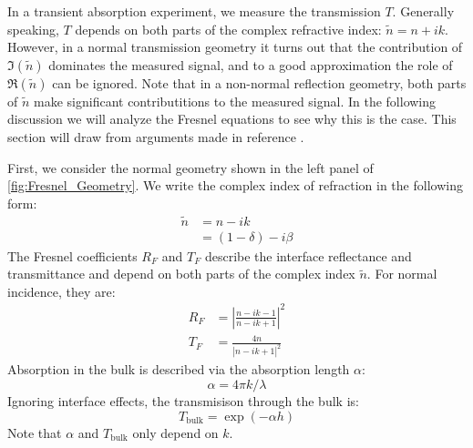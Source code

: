 In a transient absorption experiment, we measure the transmission $T$. Generally speaking, $T$ depends on both parts of the complex refractive index: $\tilde{n} = n + i k$. However, in a normal transmission geometry it turns out that the contribution of $\Im(\tilde{n})$ dominates the measured signal, and to a good approximation the role of $\Re(\tilde{n})$ can be ignored. Note that in a non-normal reflection geometry, both parts of $\tilde{n}$ make significant contributitions to the measured signal. In the following discussion we will analyze the Fresnel equations to see why this is the case. This section will draw from arguments made in reference \cite{nichelattiComplexRefractiveIndex2002}.

First, we consider the normal geometry shown in the left panel of \cref{fig:Fresnel_Geometry}. We write the complex index of refraction in the following form:
\begin{equation}
\begin{aligned}
\tilde{n} &= n - i k \\
&= (1-\delta) - i \beta
\end{aligned}
\label{eqn:complex_index}
\end{equation}
The Fresnel coefficients $R_F$ and $T_F$ describe the interface reflectance and transmittance and depend on both parts of the complex index $\tilde{n}$. For normal incidence, they are:
\begin{equation}
\begin{aligned}
R_F &= \left| \frac{n-ik-1}{n-ik+1}   \right|^2 \\
T_F &=  \frac{4n}{\left|n-ik+1\right|^2}
\end{aligned}
\label{eqn:fresnel_normal}
\end{equation}
Absorption in the bulk is described via the absorption length $\alpha$:
\begin{equation}
\alpha = 4 \pi k / \lambda
\end{equation}
Ignoring interface effects, the transmisison through the bulk is:
\begin{equation}
T_{\text{bulk}} = \exp( - \alpha h)
\end{equation}
Note that $\alpha$ and $T_{\text{bulk}}$ only depend on $k$.

